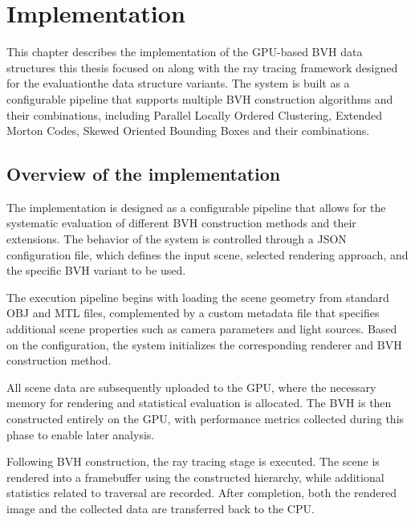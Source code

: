 \chapter{Implementation}
\label{chap:implementation}

\begin{chapterabstract}
This chapter describes the implementation of the GPU-based BVH data structures this thesis focused on along with the ray tracing framework designed for the evaluationthe data structure variants. The system is built as a configurable pipeline that supports multiple BVH construction algorithms and their combinations, including Parallel Locally Ordered Clustering, Extended Morton Codes, Skewed Oriented Bounding Boxes and their combinations.
\end{chapterabstract}

\section{Overview of the implementation}

The implementation is designed as a configurable pipeline that allows for the systematic evaluation of different BVH construction methods and their extensions. The behavior of the system is controlled through a JSON configuration file, which defines the input scene, selected rendering approach, and the specific BVH variant to be used.

The execution pipeline begins with loading the scene geometry from standard OBJ and MTL files, complemented by a custom metadata file that specifies additional scene properties such as camera parameters and light sources. Based on the configuration, the system initializes the corresponding renderer and BVH construction method.

All scene data are subsequently uploaded to the GPU, where the necessary memory for rendering and statistical evaluation is allocated. The BVH is then constructed entirely on the GPU, with performance metrics collected during this phase to enable later analysis.

Following BVH construction, the ray tracing stage is executed. The scene is rendered into a framebuffer using the constructed hierarchy, while additional statistics related to traversal are recorded. After completion, both the rendered image and the collected data are transferred back to the CPU.

